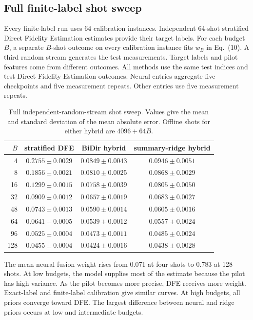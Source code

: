 \documentclass[10pt]{article}
\begin{document}
\subsection{Full finite-label shot sweep}
Every finite-label run uses 64 calibration instances. Independent 64-shot stratified Direct Fidelity Estimation estimates provide their target labels. For each budget $B$, a separate $B$-shot outcome on every calibration instance fits $w_B$ in Eq.~(10). A third random stream generates the test measurements. Target labels and pilot features come from different outcomes. All methods use the same test indices and test Direct Fidelity Estimation outcomes. Neural entries aggregate five checkpoints and five measurement repeats. Other entries use five measurement repeats.

\begin{table}[h]
\centering
\caption{Full independent-random-stream shot sweep. Values give the mean and standard deviation of the mean absolute error. Offline shots for either hybrid are $4096+64B$.}
\label{tab:supp_hybrid_sweep}
\small
\begin{tabular}{rccc}
\toprule
$B$ & stratified DFE & BiDir hybrid & summary-ridge hybrid \\
\midrule
4   & $0.2755\pm0.0029$ & $0.0849\pm0.0043$ & $0.0946\pm0.0051$ \\
8   & $0.1856\pm0.0021$ & $0.0810\pm0.0025$ & $0.0868\pm0.0029$ \\
16  & $0.1299\pm0.0015$ & $0.0758\pm0.0039$ & $0.0805\pm0.0050$ \\
32  & $0.0909\pm0.0012$ & $0.0657\pm0.0019$ & $0.0683\pm0.0027$ \\
48  & $0.0743\pm0.0013$ & $0.0590\pm0.0014$ & $0.0605\pm0.0016$ \\
64  & $0.0641\pm0.0005$ & $0.0539\pm0.0012$ & $0.0557\pm0.0024$ \\
96  & $0.0525\pm0.0004$ & $0.0473\pm0.0011$ & $0.0485\pm0.0024$ \\
128 & $0.0455\pm0.0004$ & $0.0424\pm0.0016$ & $0.0438\pm0.0028$ \\
\bottomrule
\end{tabular}
\end{table}

The mean neural fusion weight rises from 0.071 at four shots to 0.783 at 128 shots. At low budgets, the model supplies most of the estimate because the pilot has high variance. As the pilot becomes more precise, DFE receives more weight. Exact-label and finite-label calibration give similar curves. At high budgets, all priors converge toward DFE. The largest difference between neural and ridge priors occurs at low and intermediate budgets.
\end{document}

